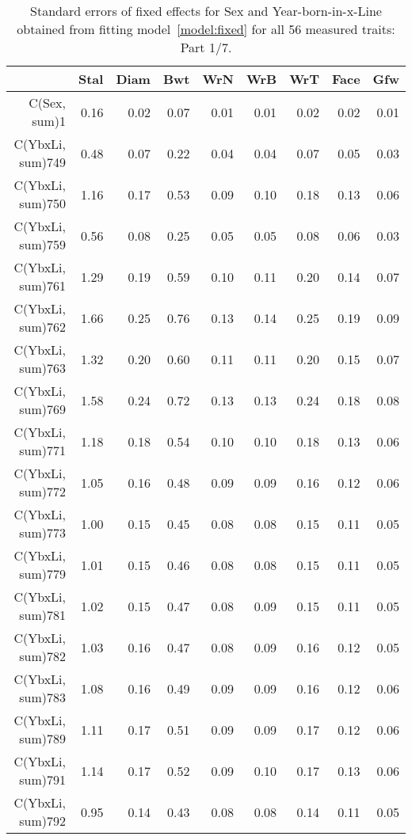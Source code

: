 \begin{table}[p]
\centering
\caption{Standard errors of fixed effects for Sex and Year-born-in-x-Line obtained from fitting model~\ref{model:fixed} for all 56 measured traits: Part 1/7.}
\label{tab:seb1}
\begin{tabular}{rrrrrrrrr}
  \hline
 & Stal & Diam & Bwt & WrN & WrB & WrT & Face & Gfw \\ 
  \hline
C(Sex, sum)1 & 0.16 & 0.02 & 0.07 & 0.01 & 0.01 & 0.02 & 0.02 & 0.01 \\ 
  C(YbxLi, sum)749 & 0.48 & 0.07 & 0.22 & 0.04 & 0.04 & 0.07 & 0.05 & 0.03 \\ 
  C(YbxLi, sum)750 & 1.16 & 0.17 & 0.53 & 0.09 & 0.10 & 0.18 & 0.13 & 0.06 \\ 
  C(YbxLi, sum)759 & 0.56 & 0.08 & 0.25 & 0.05 & 0.05 & 0.08 & 0.06 & 0.03 \\ 
  C(YbxLi, sum)761 & 1.29 & 0.19 & 0.59 & 0.10 & 0.11 & 0.20 & 0.14 & 0.07 \\ 
  C(YbxLi, sum)762 & 1.66 & 0.25 & 0.76 & 0.13 & 0.14 & 0.25 & 0.19 & 0.09 \\ 
  C(YbxLi, sum)763 & 1.32 & 0.20 & 0.60 & 0.11 & 0.11 & 0.20 & 0.15 & 0.07 \\ 
  C(YbxLi, sum)769 & 1.58 & 0.24 & 0.72 & 0.13 & 0.13 & 0.24 & 0.18 & 0.08 \\ 
  C(YbxLi, sum)771 & 1.18 & 0.18 & 0.54 & 0.10 & 0.10 & 0.18 & 0.13 & 0.06 \\ 
  C(YbxLi, sum)772 & 1.05 & 0.16 & 0.48 & 0.09 & 0.09 & 0.16 & 0.12 & 0.06 \\ 
  C(YbxLi, sum)773 & 1.00 & 0.15 & 0.45 & 0.08 & 0.08 & 0.15 & 0.11 & 0.05 \\ 
  C(YbxLi, sum)779 & 1.01 & 0.15 & 0.46 & 0.08 & 0.08 & 0.15 & 0.11 & 0.05 \\ 
  C(YbxLi, sum)781 & 1.02 & 0.15 & 0.47 & 0.08 & 0.09 & 0.15 & 0.11 & 0.05 \\ 
  C(YbxLi, sum)782 & 1.03 & 0.16 & 0.47 & 0.08 & 0.09 & 0.16 & 0.12 & 0.05 \\ 
  C(YbxLi, sum)783 & 1.08 & 0.16 & 0.49 & 0.09 & 0.09 & 0.16 & 0.12 & 0.06 \\ 
  C(YbxLi, sum)789 & 1.11 & 0.17 & 0.51 & 0.09 & 0.09 & 0.17 & 0.12 & 0.06 \\ 
  C(YbxLi, sum)791 & 1.14 & 0.17 & 0.52 & 0.09 & 0.10 & 0.17 & 0.13 & 0.06 \\ 
  C(YbxLi, sum)792 & 0.95 & 0.14 & 0.43 & 0.08 & 0.08 & 0.14 & 0.11 & 0.05 \\ 

\end{tabular}
\end{table}
